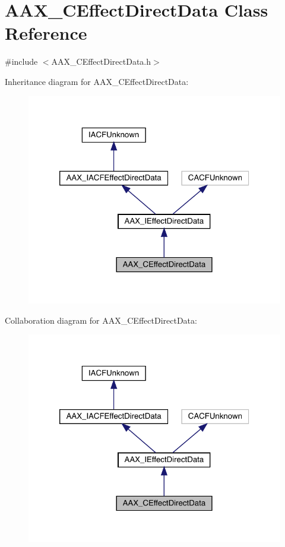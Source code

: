 \hypertarget{a01473}{}\section{A\+A\+X\+\_\+\+C\+Effect\+Direct\+Data Class Reference}
\label{a01473}


{\ttfamily \#include $<$A\+A\+X\+\_\+\+C\+Effect\+Direct\+Data.\+h$>$}



Inheritance diagram for A\+A\+X\+\_\+\+C\+Effect\+Direct\+Data\+:
\nopagebreak
\begin{figure}[H]
\begin{center}
\leavevmode
\includegraphics[width=320pt]{a01472}
\end{center}
\end{figure}


Collaboration diagram for A\+A\+X\+\_\+\+C\+Effect\+Direct\+Data\+:
\nopagebreak
\begin{figure}[H]
\begin{center}
\leavevmode
\includegraphics[width=320pt]{a01471}
\end{center}
\end{figure}


